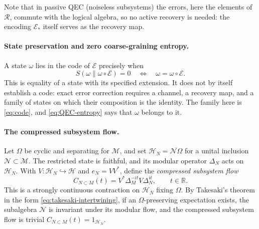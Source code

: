 \documentclass[a4paper,11pt]{article}
\theoremstyle{definition}
\newcommand{\mN}{\mathcal{N}}
\newcommand{\mE}{\mathcal{E}}
\begin{document}
Note that in passive QEC (noiseless subsystems) the errors, here the elements of $\mathcal R$, commute with the logical algebra, so no active recovery is needed: the encoding $\mE_*$ itself serves as the recovery map.

\paragraph{State preservation and zero coarse-graining entropy.}
A state $\omega$ lies in the code of $\mE$ precisely when
\begin{equation}
 S(\omega\|\omega\circ\mE)=0\quad\Longleftrightarrow\quad\omega=\omega\circ\mE .
 \label{eq:QEC-entropy}
\end{equation}
This is equality of a state with its specified extension. It does not by itself establish a code: exact error correction requires a channel, a recovery map, and a family of states on which their composition is the identity. The family here is \eqref{eq:code}, and \eqref{eq:QEC-entropy} says that $\omega$ belongs to it.

\paragraph{The compressed subsystem flow.}
Let $\Omega$ be cyclic and separating for $\mathcal M$, and set
$\mathcal H_N=\overline{\mathcal N\Omega}$ for a unital inclusion $\mathcal N\subset\mathcal M$.
The restricted state is faithful, and its modular operator $\Delta_N$ acts on
$\mathcal H_N$. With $V:\mathcal H_N\hookrightarrow\mathcal H$ and $e_N=VV^*$,
define the {\it compressed subsystem flow}
\begin{equation}
 C_{N\subset M}(t)=V^*\Delta_M^{-it}V\Delta_N^{it},
 \qquad t\in\mathbb R.
\end{equation}
This is a strongly continuous contraction on $\mathcal H_N$ fixing $\Omega$. By Takesaki's theorem in the form \eqref{eq:takesaki-intertwining}, if an $\Omega$-preserving expectation exists, the subalgebra $\mN$ is invariant under its modular flow, and the compressed subsystem flow is trivial
$C_{N\subset M}(t)=1_{\mathcal H_N}$.
\end{document}
